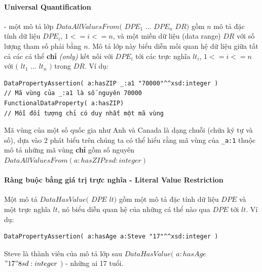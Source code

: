 \paragraph{Universal Quantification} - một mô tả lớp $DataAllValuesFrom($ $DPE_{1}$ ... $DPE_{n}$ $DR)$ gồm $n$ mô tả đặc tính dữ liệu $DPE_{i}$, $1<=i<=n$, và một miền dữ liệu (data range) $DR$ với số lượng tham số phải bằng $n$. Mô tả lớp này biểu diễn mối quan hệ dữ liệu giữa tất cả các cá thể \textbf{chỉ} \textit{(only)} kết nối với $DPE_{i}$ tới các trực nghĩa $lt_{i}$, $1<=i<=n$ với $($ $lt_{1}$ ... $lt_{n}$ $)$ trong $DR$. Ví dụ: 

\begin{verbatim}
DataPropertyAssertion( a:hasZIP _:a1 "70000"^^xsd:integer ) 
// Mã vùng của _:a1 là số nguyên 70000
FunctionalDataProperty( a:hasZIP) 
// Mỗi đối tượng chỉ có duy nhất một mã vùng
\end{verbatim}
Mã vùng của một số quốc gia như Anh và Canada là dạng chuỗi (chứa ký tự và số), dựa vào 2 phát biểu trên chúng ta có thể hiểu rằng mã vùng của \verb|_a:1| thuộc mô tả những mã vùng \textbf{chỉ} gồm số nguyên $DataAllValuesFrom( a:hasZIP xsd:integer )$

\paragraph{Ràng buộc bằng giá trị trực nghĩa - Literal Value Restriction}
Một mô tả $DataHasValue($ $DPE$ $lt)$ gồm một mô tả đặc tính dữ liệu $DPE$ và một trực nghĩa $lt$, nó biểu diễn quan hệ của những cá thể nào qua $DPE$ tới $lt$. Ví dụ:
\begin{verbatim}
DataPropertyAssertion( a:hasAge a:Steve "17"^^xsd:integer )
\end{verbatim}
Steve là thành viên của mô tả lớp sau $DataHasValue($ $a:hasAge$ $"17"^^xsd:integer$ $)$ - những ai 17 tuổi.

